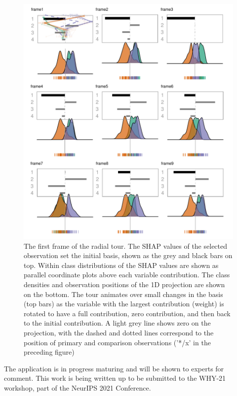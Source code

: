 \documentclass[
  11,
]{article}
\begin{document}
\begin{figure}

{\centering \includegraphics[width=1\linewidth]{figures/cheem_manualtour} 

}

\caption{The first frame of the radial tour. The SHAP values of the selected observation set the initial basis, shown as the grey and black bars on top. Within class distributions of the SHAP values are shown as parallel coordinate plots above each variable contribution. The class densities and observation positions of the 1D projection are shown on the bottom. The tour animates over small changes in the basis (top bars) as the variable with the largest contribution (weight) is rotated to have a full contribution, zero contribution, and then back to the initial contribution. A light grey line shows zero on the projection, with the dashed and dotted lines correspond to the position of primary and comparison observations ('*/x' in the preceding figure)}\label{fig:cheemTour}
\end{figure}

The application is in progress maturing and will be shown to experts for comment. This work is being written up to be submitted to the WHY-21 workshop, part of the NeurIPS 2021 Conference.
\end{document}
